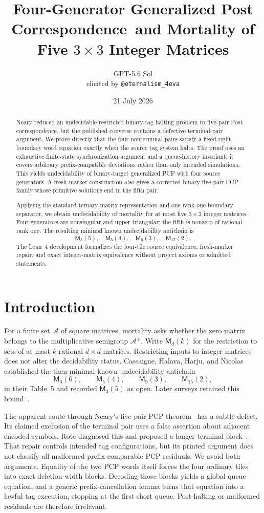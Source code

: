 \documentclass[11pt]{article}
\title{Four-Generator Generalized Post Correspondence\
and Mortality of Five $3\times3$ Integer Matrices}
\author{GPT-5.6 Sol\\\normalsize elicited by \texttt{@eternalism\_4eva}}
\date{21 July 2026}
\newcommand{\Mort}{\mathsf{M}}
\begin{document}
\maketitle

\begin{abstract}
Neary reduced an undecidable restricted binary-tag halting problem to five-pair
Post correspondence, but the published converse contains a defective terminal-pair
argument.  We prove directly that the four nonterminal pairs satisfy a fixed-right-boundary
word equation exactly when the source tag system halts.  The proof uses an exhaustive
finite-state synchronization argument and a queue-history invariant; it covers arbitrary
prefix-compatible deviations rather than only intended simulations.  This yields
undecidability of binary-target generalized PCP with four source generators.  A fresh-marker
construction also gives a corrected binary five-pair PCP family whose primitive solutions
end in the fifth pair.

Applying the standard ternary matrix representation and one rank-one boundary separator,
we obtain undecidability of mortality for at most five $3\times3$ integer matrices.  Four
generators are nonsingular and upper triangular; the fifth is nonzero of rational rank one.
The resulting minimal known undecidability antichain is
\[
  \Mort_3(5),\quad \Mort_5(4),\quad \Mort_6(3),\quad \Mort_{12}(2).
\]
The Lean~4 development formalizes the four-tile source equivalence, fresh-marker repair, and
exact integer-matrix equivalence without project axioms or admitted statements.
\end{abstract}

\section{Introduction}

For a finite set $\mathcal A$ of square matrices, mortality asks whether the zero matrix
belongs to the multiplicative semigroup $\mathcal A^+$.  Write $\Mort_d(k)$ for the
restriction to sets of at most $k$ rational $d\times d$ matrices.  Restricting inputs to
integer matrices does not alter the decidability status.  Cassaigne, Halava, Harju, and
Nicolas~\cite{CHHN14} established the then-minimal known undecidability antichain
\[
  \Mort_3(6),\qquad \Mort_5(4),\qquad \Mort_9(3),\qquad \Mort_{15}(2),
\]
in their Table~5 and recorded $\Mort_3(5)$ as open.  Later surveys retained this
bound~\cite{BPS21,Dong23}.

The apparent route through Neary's five-pair PCP theorem~\cite{Neary15} has a subtle defect.
Its claimed exclusion of the terminal pair uses a false assertion about adjacent encoded
symbols.  Rote diagnosed this and proposed a longer terminal block~\cite{Rote25}.  That
repair controls intended tag configurations, but its printed argument does not classify all
malformed prefix-comparable PCP residuals.  We avoid both arguments.  Equality of the two
PCP words itself forces the four ordinary tiles into exact deletion-width blocks.  Decoding
those blocks yields a global queue equation, and a generic prefix-cancellation lemma turns
that equation into a lawful tag execution, stopping at the first short queue.  Post-halting
or malformed residuals are therefore irrelevant.
\end{document}
